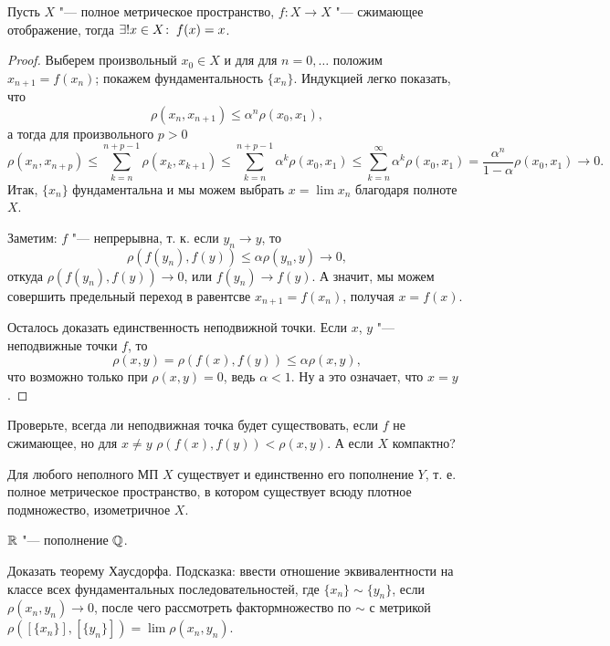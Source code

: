 \documentclass[main]{subfiles}
\begin{document}
\begin{theorem}
  Пусть \( X \) "--- полное метрическое пространство,
  \( f : X \to X \) "--- сжимающее отображение,
  тогда \( \exists! x \in X \colon \: f(x) = x \).
\end{theorem}
\begin{proof}
  Выберем произвольный \( x_0 \in X \) и для
  для \( n = 0, \dots \) положим \( x_{n + 1} = f(x_n) \);
  покажем фундаментальность \( \{ x_n \} \).
  Индукцией легко показать, что
  \[
    \rho(x_n, x_{n+1}) \le \alpha^n \rho(x_0, x_1),
  \]
  а тогда для произвольного \( p > 0 \)
  \[
    \rho(x_n, x_{n+p}) \le
    \sum_{k = n}^{n + p - 1} \rho(x_k, x_{k + 1}) \le
    \sum_{k = n}^{n + p - 1} \alpha^k \rho(x_0, x_1) \le
    \sum_{k = n}^\infty \alpha^k \rho(x_0, x_1) =
    \frac{\alpha^n}{1 - \alpha} \rho(x_0, x_1) \to 0.
  \]
  Итак, \( \{ x_n \} \) фундаментальна и мы можем выбрать
  \( x = \lim x_n \) благодаря полноте \( X \).

  Заметим: \( f \) "--- непрерывна, т. к.
  если \( y_n \to y \), то
  \[
    \rho(f(y_n), f(y)) \le \alpha \rho(y_n, y) \to 0,
  \]
  откуда \( \rho(f(y_n), f(y)) \to 0 \), или
  \( f(y_n) \to f(y) \).
  А значит, мы можем совершить предельный переход
  в равентсве \( x_{n + 1} = f(x_n) \), получая
  \( x = f(x) \).

  Осталось доказать единственность неподвижной точки.
  Если \( x \), \( y \) "--- неподвижные точки \( f \),
  то
  \[
    \rho(x, y) = \rho(f(x), f(y)) \le \alpha \rho(x, y),
  \]
  что возможно только при \( \rho(x, y) = 0 \),
  ведь \( \alpha < 1 \). Ну а это означает, что \( x = y \).
\end{proof}

\begin{exercise}
  Проверьте, всегда ли неподвижная точка будет существовать,
  если \( f \) не сжимающее, но для \( x \ne y \)
  \( \rho(f(x), f(y)) < \rho(x, y) \). А если \( X \) компактно?
\end{exercise}

\begin{theorem}[Хаусдорф, б/д]
  Для любого неполного МП \( X \) существует и единственно его
  пополнение \( Y \), т. е. полное метрическое пространство,
  в котором существует всюду плотное подмножество, изометричное \( X \).
\end{theorem}

\begin{example}
  \( \mathbb{R} \) "--- пополнение \( \mathbb{Q} \).
\end{example}

\begin{exercise}
  Доказать теорему Хаусдорфа. Подсказка: ввести
  отношение эквивалентности на классе всех
  фундаментальных последовательностей,
  где \( \{ x_n \} \sim \{ y_n \} \),
  если \( \rho(x_n, y_n) \to 0 \),
  после чего рассмотреть фактормножество по \( \sim \)
  с метрикой
  \( \rho([\{ x_n \}], [\{ y_n \}]) = \lim \rho(x_n, y_n) \).
\end{exercise}
\end{document}
